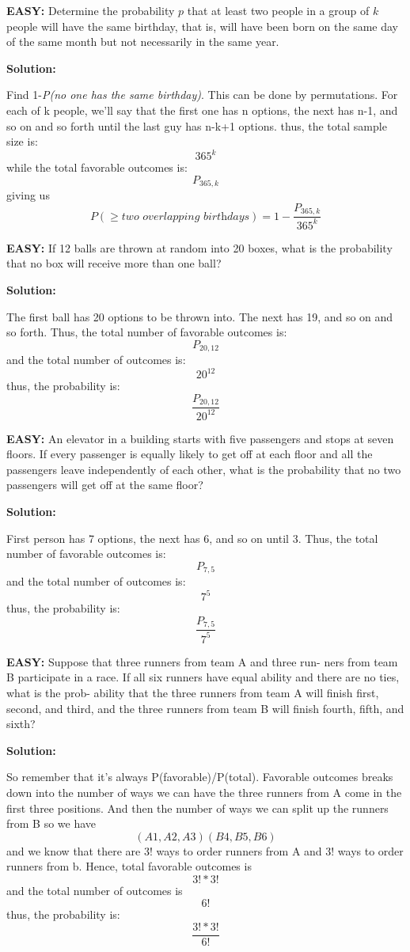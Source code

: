 \documentclass[12pt]{article}
\newcommand{\solution}{\noindent\textbf{Solution:}\par\nopagebreak}
\newcommand{\easy}[1]{\noindent\textcolor{OliveGreen}{\textbf{EASY:}} #1 \par}
\begin{document}
\easy{Determine the probability \( p \) that at least two people in a group of \( k \) people will have the same birthday, that is, will have been born on the same day of the same month but not necessarily in the same year.}
\solution
Find 1-\textit{P(no one has the same birthday)}. This can be done by permutations. For each of k people, we'll say that the first one has n options, the next has n-1, and so on and so forth until the last guy has n-k+1 options. thus, the total sample size is: \[365^k\] while the total favorable outcomes is: \[P_{365,k}\]giving us \[P(\geq \textit{two overlapping birthdays})=  1-\frac{P_{365,k}}{365^k}\]


\easy{
    If 12 balls are thrown at random into 20 boxes, what
    is the probability that no box will receive more than one
    ball?
}
\solution

The first ball has 20 options to be thrown into. The next has 19, and so on and so forth.
Thus, the total number of favorable outcomes is:
\[
P_{20,12}
\]
and the total number of outcomes is:
\[
20^{12}
\]
thus, the probability is:
\[
\frac{P_{20,12}}{20^{12}}
\]

\easy{
    An elevator in a building starts with ﬁve passengers
and stops at seven ﬂoors. If every passenger is equally
likely to get off at each ﬂoor and all the passengers leave
independently of each other, what is the probability that
no two passengers will get off at the same ﬂoor?
}

\solution

First person has 7 options, the next has 6, and so on until 3.
Thus, the total number of favorable outcomes is:
\[
P_{7,5}
\]
and the total number of outcomes is:
\[
7^5
\]
thus, the probability is:
\[
\frac{P_{7,5}}{7^5}
\]


\easy{
    Suppose that three runners from team A and three run-
ners from team B participate in a race. If all six runners
have equal ability and there are no ties, what is the prob-
ability that the three runners from team A will ﬁnish ﬁrst,
second, and third, and the three runners from team B will
ﬁnish fourth, ﬁfth, and sixth?
}

\solution
So remember that it's always P(favorable)/P(total). Favorable outcomes breaks down into the number of ways
we can have the three runners from A come in the first three positions. And then the number of ways we can split up the runners from B
so we have 
\[
(A1,A2,A3) (B4,B5,B6)
\]
and we know that there are 3! ways to order runners from A and 3! ways to order runners from b.
Hence, total favorable outcomes is 
\[
3!*3!
\]
and the total number of outcomes is
\[
6!
\]
thus, the probability is:
\[
\frac{3!*3!}{6!}
\]
\end{document}
